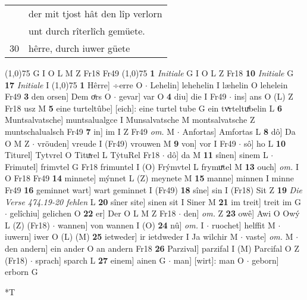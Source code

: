 \documentclass[8pt,a4paper,notitlepage]{article}
\begin{document}
\begin{table}[ht]
\begin{minipage}[t]{0.5\linewidth}
\begin{tabular}{rl}
 & der mit tjost hât den lîp verlorn\\ 
 & unt durch rîterlîch gemüete.\\ 
30 & hêrre, durch iuwer güete\\ 
\end{tabular}
\scriptsize
\line(1,0){75} \newline
G I O L M Z Fr18 Fr49 \newline
\line(1,0){75} \newline
\textbf{1} \textit{Initiale} G I O L Z Fr18  \textbf{10} \textit{Initiale} G  \textbf{17} \textit{Initiale} I  \newline
\line(1,0){75} \newline
\textbf{1} Hêrre] ÷erre O  $\cdot$ Lehelin] lehehelin I læhelin O lehelein Fr49 \textbf{3} den orsen] Dem oͤrs O  $\cdot$ gevar] var O \textbf{4} diu] die I Fr49  $\cdot$ ins] ans O (L) Z Fr18 usz M \textbf{5} eine turteltûbe] [eich]: eine turtel tube G ein tvͯrteltuͯbelin L \textbf{6} Muntsalvatsche] muntsalualgce I Munsalvatsche M montsalvatsche Z muntschalualsch Fr49 \textbf{7} in] im I Z Fr49 \textit{om.} M  $\cdot$ Anfortas] Amfortas L \textbf{8} dô] Da O M Z  $\cdot$ vröuden] vreude I (Fr49) vrouwen M \textbf{9} von] vor I Fr49  $\cdot$ sô] ho L \textbf{10} Titurel] Tytvrel O Tituͯrel L TẏtuRel Fr18  $\cdot$ dô] da M \textbf{11} sînen] sinem L  $\cdot$ Frimutel] frimvtel G Fr18 frimuntel I (O) Frýmvtel L frymuͯtel M \textbf{13} ouch] \textit{om.} I O Fr18 Fr49 \textbf{14} minnete] mýnnet L (Z) meynete M \textbf{15} manne] minnen I minne Fr49 \textbf{16} geminnet wart] wart geminnet I (Fr49) \textbf{18} sîne] sin I (Fr18) Sit Z \textbf{19} \textit{Die Verse 474.19-20 fehlen} L  \textbf{20} sîner site] sinen sit I Siner M \textbf{21} im treit] treit im G  $\cdot$ gelîchiu] gelichen O \textbf{22} er] Der O L M Z Fr18  $\cdot$ den] \textit{om.} Z \textbf{23} owê] Awi O Owý L (Z) (Fr18)  $\cdot$ wannen] von wannen I (O) \textbf{24} nû] \textit{om.} I  $\cdot$ ruochet] helffit M  $\cdot$ iuwern] iwer O (L) (M) \textbf{25} ietweder] ir ietdweder I Ja wilchir M  $\cdot$ vaste] \textit{om.} M  $\cdot$ den andern] ein ander O an andern Fr18 \textbf{26} Parzival] parzifal I (M) Parcifal O Z (Fr18)  $\cdot$ sprach] sparch L \textbf{27} einem] ainen G  $\cdot$ man] [wirt]: man O  $\cdot$ geborn] erborn G \newline
\end{minipage}
\hspace{0.5cm}
\begin{minipage}[t]{0.5\linewidth}
\small
\begin{center}*T

\end{center}
\end{minipage}
\end{table}
\end{document}
